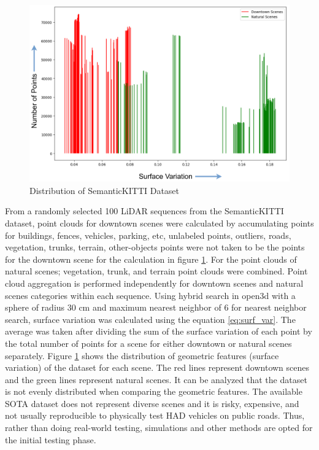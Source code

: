 \begin{figure}[htb]
    \centering
    \includegraphics[width=1\linewidth]{97_graphics/related_work/downtown_and_vegetation_sv.pdf}
    \caption{Distribution of SemanticKITTI Dataset}
    \label{fig:related_work-downtown_and_vegetation_sv}
\end{figure}

From a randomly selected 100 LiDAR sequences from the SemanticKITTI dataset, point clouds for downtown scenes were calculated by accumulating points for buildings, fences, vehicles, parking, etc, unlabeled points, outliers, roads, vegetation, trunks, terrain, other-objects points were not taken to be the points for the downtown scene for the calculation in figure \ref{fig:related_work-downtown_and_vegetation_sv}. For the point clouds of natural scenes; vegetation, trunk, and terrain point clouds were combined. Point cloud aggregation is performed independently for downtown scenes and natural scenes categories within each sequence. Using hybrid search in open3d \parencite{open3d} with a sphere of radius 30 cm and maximum nearest neighbor of 6 for nearest neighbor search, surface variation was calculated using the equation \ref{eq:surf_var}. The average was taken after dividing the sum of the surface variation of each point by the total number of points for a scene for either downtown or natural scenes separately. Figure \ref{fig:related_work-downtown_and_vegetation_sv} shows the distribution of geometric features (surface variation) of the dataset for each scene. The red lines represent downtown scenes and the green lines represent natural scenes. It can be analyzed that the dataset is not evenly distributed when comparing the geometric features. The available SOTA dataset does not represent diverse scenes and it is risky, expensive, and not usually reproducible to physically test HAD vehicles on public roads. Thus, rather than doing real-world testing, simulations and other methods are opted for the initial testing phase.





